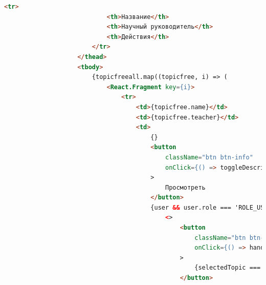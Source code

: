 \documentclass[14pt]{extarticle} %
\begin{document}
\begin{lstlisting}[language=html, caption={Клиентская часть TopicFreeList}]
                        <tr>
                            <th>Название</th>
                            <th>Научный руководитель</th>
                            <th>Действия</th>
                        </tr>
                    </thead>
                    <tbody>
                        {topicfreeall.map((topicfree, i) => (
                            <React.Fragment key={i}>
                                <tr>
                                    <td>{topicfree.name}</td>
                                    <td>{topicfree.teacher}</td>
                                    <td>
                                        {}
                                        <button 
                                            className="btn btn-info" 
                                            onClick={() => toggleDescription(topicfree.id)}
                                        >
                                            Просмотреть
                                        </button>
                                        {user && user.role === 'ROLE_USER' && (
                                            <>
                                                <button 
                                                    className="btn btn-primary ms-2"
                                                    onClick={() => handleSelectTopic(topicfree.id)}
                                                >
                                                    {selectedTopic === topicfree.id ? 'Выбрана' : 'Выбрать'}
                                                </button>


\end{lstlisting}
\end{document}
